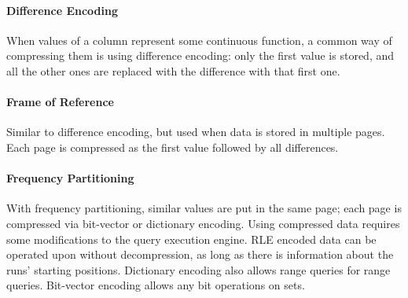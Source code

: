 \paragraph{Difference Encoding}
When values of a column represent some continuous function, a common way of compressing them is using difference encoding: only the first value is stored, and all the other ones are replaced with the difference with that first one.

\paragraph{Frame of Reference}
Similar to difference encoding, but used when data is stored in multiple pages. Each page is compressed as the first value followed by all differences.

\paragraph{Frequency Partitioning}
With frequency partitioning, similar values are put in the same page; each page is compressed via bit-vector or dictionary encoding. Using compressed data requires some modifications to the query execution engine. RLE encoded data can be operated upon without decompression, as long as there is information about the runs' starting positions. Dictionary encoding also allows range queries for range queries. Bit-vector encoding allows any bit operations on sets.

